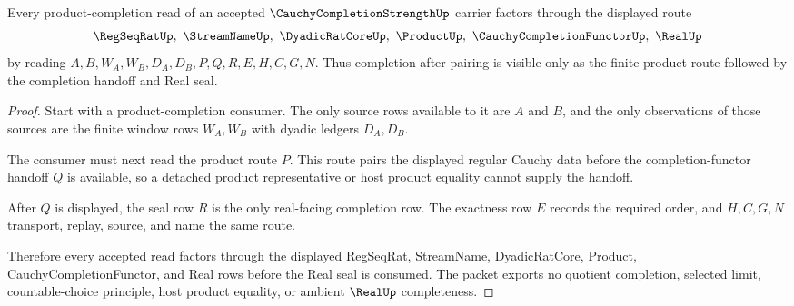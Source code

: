 \begin{theorem}
\label{thm:cauchy-completion-strength-product-route}
Every product-completion read of an accepted $\CauchyCompletionStrengthUp$ carrier factors through the displayed route
$$
\RegSeqRatUp,\ \StreamNameUp,\ \DyadicRatCoreUp,\ \ProductUp,\ \CauchyCompletionFunctorUp,\ \RealUp
$$
by reading $A,B,W_A,W_B,D_A,D_B,P,Q,R,E,H,C,G,N$. Thus completion after pairing is visible only as the finite product route followed by the completion handoff and Real seal.
\end{theorem}
\begin{proof}
Start with a product-completion consumer. The only source rows available to it are $A$ and $B$, and the only observations of those sources are the finite window rows $W_A,W_B$ with dyadic ledgers $D_A,D_B$.

The consumer must next read the product route $P$. This route pairs the displayed regular Cauchy data before the completion-functor handoff $Q$ is available, so a detached product representative or host product equality cannot supply the handoff.

After $Q$ is displayed, the seal row $R$ is the only real-facing completion row. The exactness row $E$ records the required order, and $H,C,G,N$ transport, replay, source, and name the same route.

Therefore every accepted read factors through the displayed RegSeqRat, StreamName, DyadicRatCore, Product, CauchyCompletionFunctor, and Real rows before the Real seal is consumed. The packet exports no quotient completion, selected limit, countable-choice principle, host product equality, or ambient $\RealUp$ completeness.
\end{proof}




